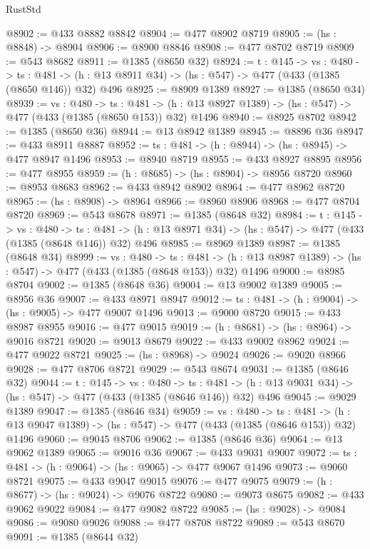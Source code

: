 \begin{lexlean}{RustStd}
\begin{coremodule}
@8902 := @433 @8882 @8842
@8904 := @477 @8902 @8719
@8905 := (hs : @8848) -> @8904
@8906 := @8900 @8846
@8908 := @477 @8702 @8719
@8909 := @543 @8682
@8911 := @1385 (@8650 @32)
@8924 := {t : @145} ->
  {vs : @480} ->
  {ts : @481} -> (h : @13 @8911 @34) -> (hs : @547) -> @477 (@433 (@1385 (@8650 @146)) @32) @496
@8925 := @8909 @1389
@8927 := @1385 (@8650 @34)
@8939 := {vs : @480} ->
  {ts : @481} -> (h : @13 @8927 @1389) -> (hs : @547) -> @477 (@433 (@1385 (@8650 @153)) @32) @1496
@8940 := @8925 @8702
@8942 := @1385 (@8650 @36)
@8944 := @13 @8942 @1389
@8945 := @8896 @36
@8947 := @433 @8911 @8887
@8952 := {ts : @481} -> (h : @8944) -> (hs : @8945) -> @477 @8947 @1496
@8953 := @8940 @8719
@8955 := @433 @8927 @8895
@8956 := @477 @8955
@8959 := (h : @8685) -> (hs : @8904) -> @8956 @8720
@8960 := @8953 @8683
@8962 := @433 @8942 @8902
@8964 := @477 @8962 @8720
@8965 := (hs : @8908) -> @8964
@8966 := @8960 @8906
@8968 := @477 @8704 @8720
@8969 := @543 @8678
@8971 := @1385 (@8648 @32)
@8984 := {t : @145} ->
  {vs : @480} ->
  {ts : @481} -> (h : @13 @8971 @34) -> (hs : @547) -> @477 (@433 (@1385 (@8648 @146)) @32) @496
@8985 := @8969 @1389
@8987 := @1385 (@8648 @34)
@8999 := {vs : @480} ->
  {ts : @481} -> (h : @13 @8987 @1389) -> (hs : @547) -> @477 (@433 (@1385 (@8648 @153)) @32) @1496
@9000 := @8985 @8704
@9002 := @1385 (@8648 @36)
@9004 := @13 @9002 @1389
@9005 := @8956 @36
@9007 := @433 @8971 @8947
@9012 := {ts : @481} -> (h : @9004) -> (hs : @9005) -> @477 @9007 @1496
@9013 := @9000 @8720
@9015 := @433 @8987 @8955
@9016 := @477 @9015
@9019 := (h : @8681) -> (hs : @8964) -> @9016 @8721
@9020 := @9013 @8679
@9022 := @433 @9002 @8962
@9024 := @477 @9022 @8721
@9025 := (hs : @8968) -> @9024
@9026 := @9020 @8966
@9028 := @477 @8706 @8721
@9029 := @543 @8674
@9031 := @1385 (@8646 @32)
@9044 := {t : @145} ->
  {vs : @480} ->
  {ts : @481} -> (h : @13 @9031 @34) -> (hs : @547) -> @477 (@433 (@1385 (@8646 @146)) @32) @496
@9045 := @9029 @1389
@9047 := @1385 (@8646 @34)
@9059 := {vs : @480} ->
  {ts : @481} -> (h : @13 @9047 @1389) -> (hs : @547) -> @477 (@433 (@1385 (@8646 @153)) @32) @1496
@9060 := @9045 @8706
@9062 := @1385 (@8646 @36)
@9064 := @13 @9062 @1389
@9065 := @9016 @36
@9067 := @433 @9031 @9007
@9072 := {ts : @481} -> (h : @9064) -> (hs : @9065) -> @477 @9067 @1496
@9073 := @9060 @8721
@9075 := @433 @9047 @9015
@9076 := @477 @9075
@9079 := (h : @8677) -> (hs : @9024) -> @9076 @8722
@9080 := @9073 @8675
@9082 := @433 @9062 @9022
@9084 := @477 @9082 @8722
@9085 := (hs : @9028) -> @9084
@9086 := @9080 @9026
@9088 := @477 @8708 @8722
@9089 := @543 @8670
@9091 := @1385 (@8644 @32)

\end{coremodule}
\end{lexlean}
